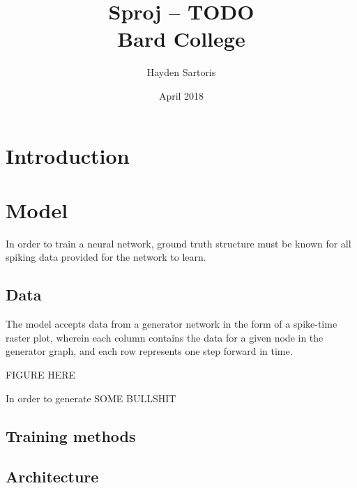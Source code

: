 \documentclass[12pt,twoside]{report}
\title{
    {Sproj -- TODO}\\
    {\large Bard College}
}
\author{Hayden Sartoris}
\date{April 2018}
\begin{document}
\maketitle

\section{Introduction}
\section{Model}
In order to train a neural network, ground truth structure must be known
for all spiking data provided for the network to learn. 
\subsection{Data}
The model accepts data from a generator network in the form of a
spike-time raster plot, wherein each column contains the data for a given
node in the generator graph, and each row represents one step forward in
time.

FIGURE HERE

In order to generate SOME BULLSHIT
\subsection{Training methods}
\subsection{Architecture}
\end{document}
